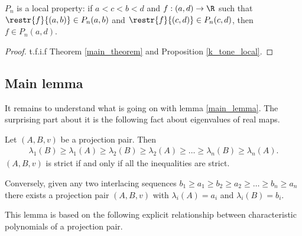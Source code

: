 \begin{kor}
	$P_{n}$ is a local property: if $a < c < b < d$ and $f : (a, d) \to \R$ such that $\restr{f}{(a, b)} \in P_{n}(a, b)$ and $\restr{f}{(c, d)} \in P_{n}(c, d)$, then $f \in P_{n}(a, d)$.
\end{kor}
\begin{proof}
	t.f.i.f Theorem \ref{main_theorem} and Proposition \ref{k_tone_local}.
\end{proof}

\subsection{Main lemma}

It remains to understand what is going on with lemma \ref{main_lemma}. The surprising part about it is the following fact about eigenvalues of real maps.

\begin{lem}\label{projection_eigenvalues}
	Let $(A, B, v)$ be a projection pair. Then
	\begin{align*}
		\lambda_{1}(B) \geq \lambda_{1}(A) \geq \lambda_{2}(B) \geq \lambda_{2}(A) \geq \ldots \geq \lambda_{n}(B) \geq \lambda_{n}(A).
	\end{align*}
	$(A, B, v)$ is strict if and only if all the inequalities are strict.

	Conversely, given any two interlacing sequences $b_{1} \geq a_{1} \geq b_{2} \geq a_{2} \geq \ldots \geq b_{n} \geq a_{n}$ there exists a projection pair $(A, B, v)$ with $\lambda_{i}(A) = a_{i}$ and $\lambda_{i}(B) = b_{i}$.
\end{lem}

This lemma is based on the following explicit relationship between characteristic polynomials of a projection pair.

